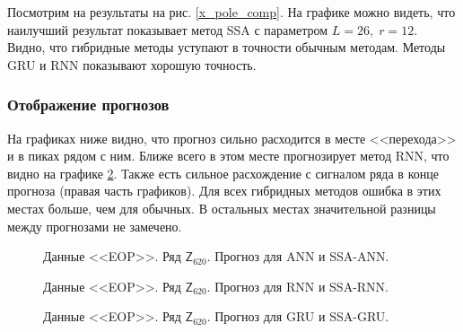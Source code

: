 \documentclass[specialist,
               substylefile = spbu.rtx,
               subf,href,colorlinks=true, 12p]{disser}
\begin{document}
Посмотрим на результаты на рис. \ref{x_pole_comp}. На графике можно видеть, что наилучший результат показывает метод SSA с параметром $L = 26, \; r = 12$. Видно, что гибридные методы уступают в точности обычным методам. Методы GRU и RNN показывают хорошую точность.

\subsubsection{Отображение прогнозов}

На графиках ниже видно, что прогноз сильно расходится в месте <<перехода>> и в пиках рядом с ним. Ближе всего в этом месте прогнозирует метод RNN, что видно на графике \ref{xpole_res_rnn}. Также есть сильное расхождение с сигналом ряда в конце прогноза (правая часть графиков). Для всех гибридных методов ошибка в этих местах больше, чем для обычных. В остальных местах значительной разницы между прогнозами не замечено.

\begin{figure}[H]
	\caption{Данные <<EOP>>. Ряд $\mathsf{Z}_{620}$. Прогноз для ANN и SSA-ANN.}
	\label{xpole_res_ann}
\end{figure}

\begin{figure}[H]
	\caption{Данные <<EOP>>. Ряд $\mathsf{Z}_{620}$. Прогноз для RNN и SSA-RNN.}
	\label{xpole_res_rnn}
\end{figure}

\begin{figure}[H]
	\caption{Данные <<EOP>>. Ряд $\mathsf{Z}_{620}$. Прогноз для GRU и SSA-GRU.}
	\label{xpole_res_gru}
\end{figure}
\end{document}
